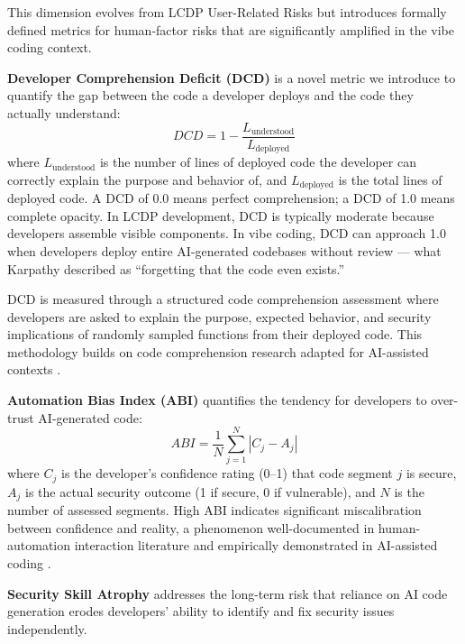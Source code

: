 \documentclass[preprint,review,12pt]{elsarticle}
\newcommand{\dcd}{\textit{DCD}}
\newcommand{\abi}{\textit{ABI}}
\begin{document}
This dimension evolves from LCDP User-Related Risks but introduces formally defined metrics for human-factor risks that are significantly amplified in the vibe coding context.

\textbf{Developer Comprehension Deficit (DCD)} is a novel metric we introduce to quantify the gap between the code a developer deploys and the code they actually understand:
\begin{equation}
    \dcd = 1 - \frac{L_{\text{understood}}}{L_{\text{deployed}}}
    \label{eq:dcd}
\end{equation}
where $L_{\text{understood}}$ is the number of lines of deployed code the developer can correctly explain the purpose and behavior of, and $L_{\text{deployed}}$ is the total lines of deployed code. A DCD of 0.0 means perfect comprehension; a DCD of 1.0 means complete opacity. In LCDP development, DCD is typically moderate because developers assemble visible components. In vibe coding, DCD can approach 1.0 when developers deploy entire AI-generated codebases without review --- what Karpathy \cite{karpathy2025vibe} described as ``forgetting that the code even exists.''

DCD is measured through a structured code comprehension assessment where developers are asked to explain the purpose, expected behavior, and security implications of randomly sampled functions from their deployed code. This methodology builds on code comprehension research adapted for AI-assisted contexts \cite{xia2023measuring, barke2023grounded}.

\textbf{Automation Bias Index (ABI)} quantifies the tendency for developers to over-trust AI-generated code:
\begin{equation}
    \abi = \frac{1}{N} \sum_{j=1}^{N} |C_j - A_j|
    \label{eq:abi}
\end{equation}
where $C_j$ is the developer's confidence rating (0--1) that code segment $j$ is secure, $A_j$ is the actual security outcome (1 if secure, 0 if vulnerable), and $N$ is the number of assessed segments. High ABI indicates significant miscalibration between confidence and reality, a phenomenon well-documented in human-automation interaction literature \cite{parasuraman1997humans, goddard2012automation} and empirically demonstrated in AI-assisted coding \cite{perry2023users}.

\textbf{Security Skill Atrophy} addresses the long-term risk that reliance on AI code generation erodes developers' ability to identify and fix security issues independently.
\end{document}

